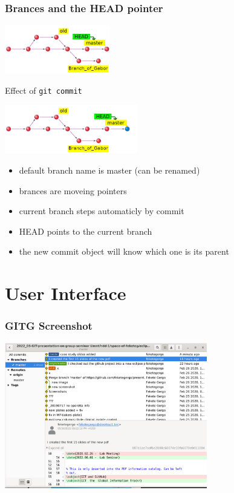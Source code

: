 \documentclass[aspectratio=169]{beamer}
\begin{document}
\begin{frame}
	\frametitle<presentation>{Brances and the HEAD pointer}

	\noindent\begin{minipage}{0.5\textwidth}
	
	\includegraphics[height=60pt]{pictures/git-head-1.png}
	
	Effect of \texttt{git commit}

	\includegraphics[height=60pt]{pictures/git-head+after-commit.png}

	\end{minipage}%
	\hfill%
	\begin{minipage}{0.45\textwidth}\raggedleft
		\begin{block}{}
		\begin{itemize}
		  \item default branch name is master (can be renamed)
		  \item brances are moveing pointers
		  \item current branch steps automaticly by commit
		  \item HEAD points to the current branch
		  \item the new commit object will know which one is its parent
		\end{itemize}
		\end{block}
	\end{minipage}
	
	
\end{frame}


\section{User Interface}

\begin{frame}
	\frametitle<presentation>{GITG Screenshot}
	
	\includegraphics[height=180pt]{pictures/gitg-screenshot-1.png}
		
\end{frame}
\end{document}
